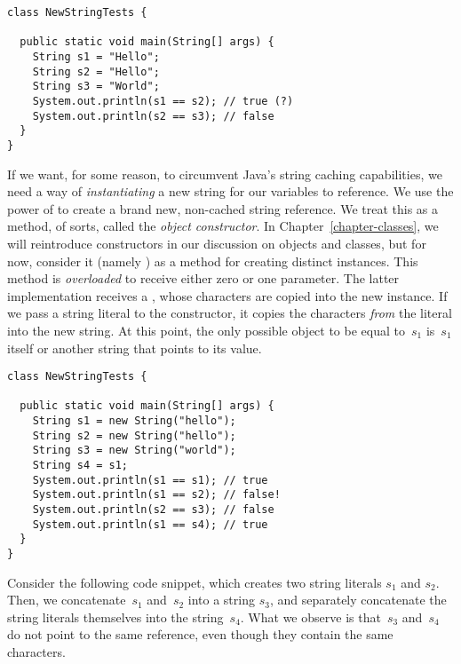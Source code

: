 \begin{lstlisting}[language=MyJava]
class NewStringTests {

  public static void main(String[] args) {
    String s1 = "Hello";
    String s2 = "Hello";
    String s3 = "World";
    System.out.println(s1 == s2); // true (?)
    System.out.println(s2 == s3); // false
  }
}
\end{lstlisting}

If we want, for some reason, to circumvent Java's string caching capabilities, we need a way of \emph{instantiating} a new string for our variables to reference. 
We use the power of  to create a brand new, non-cached string reference. 
We treat this as a method, of sorts, called the \emph{object constructor}. 
In Chapter~\ref{chapter-classes}, we will reintroduce constructors in our discussion on objects and classes, but for now, consider it (namely ) as a method for creating distinct  instances. 
This method is \emph{overloaded} to receive either zero or one parameter. 
The latter implementation receives a , whose characters are copied into the new  instance. 
If we pass a string literal to the constructor, it copies the characters \emph{from} the literal into the new string. 
At this point, the only possible object to be equal to~$s_1$ is~$s_1$ itself or another string that points to its value.

\begin{lstlisting}[language=MyJava]
class NewStringTests {

  public static void main(String[] args) {
    String s1 = new String("hello");
    String s2 = new String("hello");
    String s3 = new String("world");
    String s4 = s1;
    System.out.println(s1 == s1); // true
    System.out.println(s1 == s2); // false!
    System.out.println(s2 == s3); // false
    System.out.println(s1 == s4); // true
  }
}
\end{lstlisting}

Consider the following code snippet, which creates two string literals $s_1$ and $s_2$. Then, we concatenate~$s_1$ and~$s_2$ into a string $s_3$, and separately concatenate the string literals themselves into the string~$s_4$. 
What we observe is that~$s_3$ and~$s_4$ do not point to the same reference, even though they contain the same characters.

